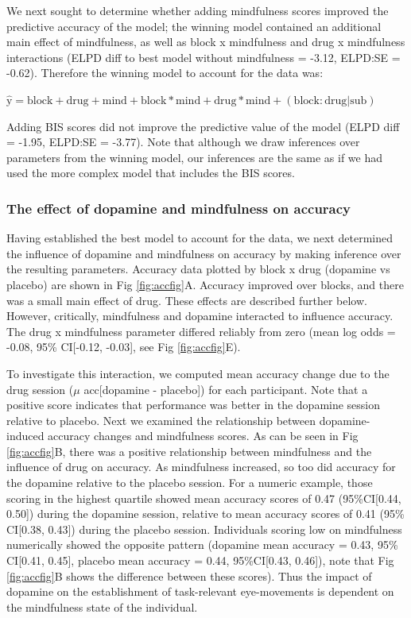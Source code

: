 \documentclass[
  man]{apa6}
\begin{document}
We next sought to determine whether adding mindfulness scores improved the predictive accuracy of the model; the winning model contained an additional main effect of mindfulness, as well as block x mindfulness and drug x mindfulness interactions (ELPD diff to best model without mindfulness = -3.12, ELPD:SE = -0.62). Therefore the winning model to account for the data was:

\(\mathrm{\hat{y}} = \mathrm{block} + \mathrm{drug} + \mathrm{mind} + \mathrm{block*mind} + \mathrm{drug*mind} + \mathrm{(block:drug|sub)}\)

Adding BIS scores did not improve the predictive value of the model (ELPD diff = -1.95, ELPD:SE = -3.77). Note that although we draw inferences over parameters from the winning model, our inferences are the same as if we had used the more complex model that includes the BIS scores.

\hypertarget{the-effect-of-dopamine-and-mindfulness-on-accuracy}{%
\subsubsection{The effect of dopamine and mindfulness on accuracy}\label{the-effect-of-dopamine-and-mindfulness-on-accuracy}}

Having established the best model to account for the data, we next determined the influence of dopamine and mindfulness on accuracy by making inference over the resulting parameters. Accuracy data plotted by block x drug (dopamine vs placebo) are shown in Fig \ref{fig:accfig}A. Accuracy improved over blocks, and there was a small main effect of drug. These effects are described further below. However, critically, mindfulness and dopamine interacted to influence accuracy. The drug x mindfulness parameter differed reliably from zero (mean log odds = -0.08, 95\% CI{[}-0.12, -0.03{]}, see Fig \ref{fig:accfig}E).

To investigate this interaction, we computed mean accuracy change due to the drug session (\(\mu\) acc{[}dopamine - placebo{]}) for each participant. Note that a positive score indicates that performance was better in the dopamine session relative to placebo. Next we examined the relationship between dopamine-induced accuracy changes and mindfulness scores. As can be seen in Fig \ref{fig:accfig}B, there was a positive relationship between mindfulness and the influence of drug on accuracy. As mindfulness increased, so too did accuracy for the dopamine relative to the placebo session. For a numeric example, those scoring in the highest quartile showed mean accuracy scores of 0.47 (95\%CI{[}0.44, 0.50{]}) during the dopamine session, relative to mean accuracy scores of 0.41 (95\% CI{[}0.38, 0.43{]}) during the placebo session. Individuals scoring low on mindfulness numerically showed the opposite pattern (dopamine mean accuracy = 0.43, 95\% CI{[}0.41, 0.45{]}, placebo mean accuracy = 0.44, 95\%CI{[}0.43, 0.46{]}), note that Fig \ref{fig:accfig}B shows the difference between these scores). Thus the impact of dopamine on the establishment of task-relevant eye-movements is dependent on the mindfulness state of the individual.
\end{document}

